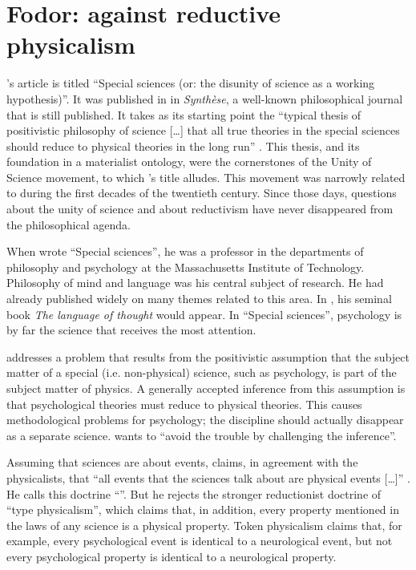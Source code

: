 \documentclass[output=paper]{langscibook}
\begin{document}
\section{Fodor: against reductive physicalism}
\label{sec:elffers:tokenphysicalism}

{\Fodor}'s article is titled ``Special sciences (or: the disunity of science as a working hypothesis)''. It was published in \citeyear{Fodor1974} in \emph{Synthèse}, a well-known philosophical journal that is still published. It takes as its starting point the ``typical thesis of positivistic philosophy of science […] that all true theories in the special sciences should reduce to physical theories in the long run'' \citep[97]{Fodor1974}. This thesis, and its foundation in a materialist ontology, were the cornerstones of the Unity of Science movement, to which {\Fodor}'s title alludes. This movement was narrowly related to  during the first decades of the twentieth century. Since those days, questions about the unity of science and about reductivism have never disappeared from the philosophical agenda.

When {\Fodor} wrote ``Special sciences'', he was a professor in the departments of philosophy and psychology at the Massachusetts Institute of Technology. Philosophy of mind and language was his central subject of research. He had already published widely on many themes related to this area. In \citeyear{Fodor1975}, his seminal book \emph{The language of thought} would appear. In ``Special sciences'', psychology is by far the science that receives the most attention.

{\Fodor} addresses a problem that results from the positivistic assumption that the subject matter of a special (i.e. non-physical) science, such as psychology, is part of the subject matter of physics. A generally accepted inference from this assumption is that psychological theories must reduce to physical theories. This causes methodological problems for psychology; the discipline should actually disappear as a separate science. \citet[98]{Fodor1974} wants to ``avoid the trouble by challenging the inference''.

Assuming that sciences are about events, {\Fodor} claims, in agreement with the physicalists, that ``all events that the sciences talk about are physical events […]'' \citep[100]{Fodor1974}. He calls this doctrine ``''. But he rejects the stronger reductionist doctrine of ``type physicalism'', which claims that, in addition, every property mentioned in the laws of any science is a physical property. Token physicalism claims that, for example, every psychological event is identical to a neurological event, but not every psychological property is identical to a neurological property.
\end{document}
